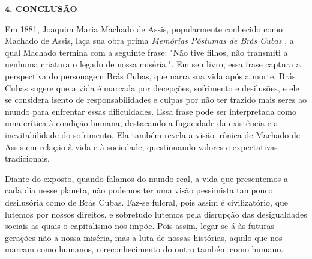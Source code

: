 \begin{titulo}
    \raggedright\raggedright\textbf{4. CONCLUSÃO}
\end{titulo}
\par
Em 1881, Joaquim Maria Machado de Assis, popularmente conhecido como Machado de Assis, laça sua obra prima \textit{Memórias Póstumas de Brás Cubas} \cite{de1998memorias}, a qual Machado termina com a seguinte frase: "Não tive filhos, não transmiti a nenhuma criatura o legado de nossa miséria.". Em seu livro, essa frase captura a perspectiva do personagem Brás Cubas, que narra sua vida após a morte. Brás Cubas sugere que a vida é marcada por decepções, sofrimento e desilusões, e ele se considera isento de responsabilidades e culpas por não ter trazido mais seres ao mundo para enfrentar essas dificuldades. Essa frase pode ser interpretada como uma crítica à condição humana, destacando a fugacidade da existência e a inevitabilidade do sofrimento. Ela também revela a visão irônica de Machado de Assis em relação à vida e à sociedade, questionando valores e expectativas tradicionais.
\par
Diante do exposto, quando falamos do mundo real, a vida que presentemos a cada dia nesse planeta, não podemos ter uma visão pessimista tampouco desilusória como de Brás Cubas. Faz-se fulcral, pois assim é civilizatório, que lutemos por nossos direitos, e sobretudo lutemos pela disrupção das desigualdades sociais as quais o capitalismo nos impõe. Pois assim, legar-se-á às futuras gerações não a nossa miséria, mas a luta de nossas histórias, aquilo que nos marcam como humanos, o reconhecimento do outro também como humano.